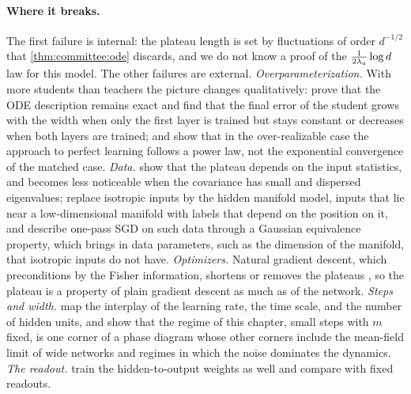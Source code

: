 \begin{refsection}
\paragraph{Where it breaks.}
The first failure is internal: the plateau length is set by fluctuations of order $d^{-1/2}$ that \cref{thm:committee:ode} discards, and we do not know a proof of the $\frac1{2\lambda_{\mathrm u}}\log d$ law for this model. The other failures are external. \emph{Overparameterization.} With more students than teachers the picture changes qualitatively: \textcite{GoldtEtAl2019} prove that the ODE description remains exact and find that the final error of the student grows with the width when only the first layer is trained but stays constant or decreases when both layers are trained; and \textcite{RichertWorschechRosenow2022} show that in the over-realizable case the approach to perfect learning follows a power law, not the exponential convergence of the matched case. \emph{Data.} \textcite{YoshidaOkada2019} show that the plateau depends on the input statistics, and becomes less noticeable when the covariance has small and dispersed eigenvalues; \textcite{GoldtEtAl2020} replace isotropic inputs by the hidden manifold model, inputs that lie near a low-dimensional manifold with labels that depend on the position on it, and describe one-pass SGD on such data through a Gaussian equivalence property, which brings in data parameters, such as the dimension of the manifold, that isotropic inputs do not have. \emph{Optimizers.} Natural gradient descent, which preconditions by the Fisher information, shortens or removes the plateaus \parencite{Amari1998,RattraySaad1999}, so the plateau is a property of plain gradient descent as much as of the network. \emph{Steps and width.} \textcite{VeigaEtAl2022} map the interplay of the learning rate, the time scale, and the number of hidden units, and show that the regime of this chapter, small steps with $m$ fixed, is one corner of a phase diagram whose other corners include the mean-field limit of wide networks and regimes in which the noise dominates the dynamics. \emph{The readout.} \textcite{RieglerBiehl1995} train the hidden-to-output weights as well and compare with fixed readouts.


\end{refsection}
